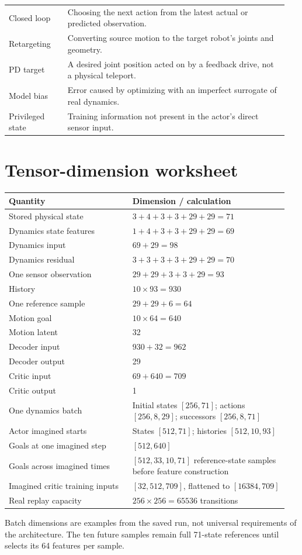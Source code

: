 \documentclass[11pt,a4paper]{article}
\newcommand{\code}[1]{\texttt{\small\detokenize{#1}}}
\begin{document}
\begin{longtable}{@{}p{0.20\linewidth}p{0.75\linewidth}@{}}
Closed loop & Choosing the next action from the latest actual or predicted observation.\\
Retargeting & Converting source motion to the target robot's joints and geometry.\\
PD target & A desired joint position acted on by a feedback drive, not a physical teleport.\\
Model bias & Error caused by optimizing with an imperfect surrogate of real dynamics.\\
Privileged state & Training information not present in the actor's direct sensor input.\\
\bottomrule
\end{longtable}

\section{Tensor-dimension worksheet}\label{app:dimensions}
\begin{longtable}{@{}p{0.42\linewidth}p{0.53\linewidth}@{}}
\toprule Quantity & Dimension / calculation\\\midrule\endhead
Stored physical state & $3+4+3+3+29+29=71$\\
Dynamics state features & $1+4+3+3+29+29=69$\\
Dynamics input & $69+29=98$\\
Dynamics residual & $3+3+3+3+29+29=70$\\
One sensor observation & $29+29+3+3+29=93$\\
History & $10\times93=930$\\
One reference sample & $29+29+6=64$\\
Motion goal & $10\times64=640$\\
Motion latent & 32\\
Decoder input & $930+32=962$\\
Decoder output & 29\\
Critic input & $69+640=709$\\
Critic output & 1\\
One dynamics batch & Initial states $[256,71]$; actions $[256,8,29]$;
successors $[256,8,71]$\\
Actor imagined starts & States $[512,71]$; histories $[512,10,93]$\\
Goals at one imagined step & $[512,640]$\\
Goals across imagined times & $[512,33,10,71]$ reference-state samples before feature construction\\
Imagined critic training inputs & $[32,512,709]$, flattened to $[16384,709]$\\
Real replay capacity & $256\times256=65536$ transitions\\
\bottomrule
\end{longtable}
Batch dimensions are examples from the saved run, not universal requirements
of the architecture. The ten future samples remain full 71-state references
until \code{goal()} selects its 64 features per sample.
\end{document}
